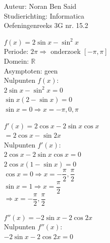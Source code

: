 \documentclass[a4paper]{article}
\begin{document}
\noindent \large Auteur: Noran Ben Said\\
\noindent \large Studierichting: Informatica\\
\noindent \large Oefeningenreeks 3G nr. 15.2 \\

\medskip
\normalsize

$f(x)= 2 \sin x - \sin^2 x$\\

Periode: $2\pi \Rightarrow$ onderzoek $\left[-\pi, \pi \right]$\\

Domein: $\mathbb{R}$\\

Asymptoten: geen\\

Nulpunten $f(x)$:\\

$2\sin x - \sin^2 x = 0$\\

$\sin x (2-\sin x)=0$\\

$\sin x = 0 \Rightarrow x=-\pi,0,\pi$\\

\medskip

$f'(x)=2\cos x - 2\sin x \cos x$\\

$=2\cos x - \sin 2x$\\

Nulpunten $f'(x)$:\\

$2\cos x - 2\sin x \cos x=0$\\

$2\cos x(1-\sin x)=0$\\

$\cos x=0 \Rightarrow x=-\dfrac{\pi}{2},\dfrac{\pi}{2}$\\

$\sin x=1 \Rightarrow x=\dfrac{\pi}{2}$\\

$\Rightarrow x=-\dfrac{\pi}{2},\dfrac{\pi}{2}$\\

\medskip

$f''(x)=-2\sin x - 2\cos 2x$\\

Nulpunten $f''(x)$:\\

$-2\sin x - 2\cos 2x=0$\\
\end{document}
